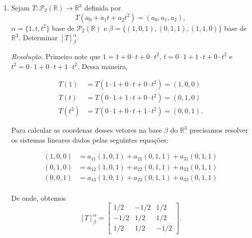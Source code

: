 \begin{enumerate}
\item Sejam $T: \mathcal{P}_2(\mathbb{R}) \rightarrow \mathbb{R}^{3}$  definida por $$T(a_0+a_1t+a_2t^2)=(a_0,a_1,a_2),$$ $\alpha = \{ 1, t, t^2\}$ base de  $\mathcal{P}_2(\mathbb{R})$ e $\beta =\{ (1,0,1), (0,1,1), (1,1,0)\}$   base de $\mathbb{R}^{3}$. Determinar $[T]_{\beta}^{\alpha}$.


\noindent\textit{Resolução.} Primeiro note que $1= 1+0\cdot t+0\cdot t^2$, $t=0\cdot 1+1\cdot t+0 \cdot t^2$ e $t^2=0\cdot 1+0\cdot t+1\cdot t^2$. Dessa maneira,

\begin{align*}
T(1)&=T(1 \cdot 1+0\cdot t+0\cdot t^2)=(1,0,0)\\
T(t)&=T(0\cdot 1+1\cdot t+0 \cdot t^2)=(0,1,0)\\
 T(t^2)&=T(0\cdot 1+0\cdot t+1\cdot t^2)=(0,0,1).
\end{align*}

Para calcular as coordenas desses vetores na base $\beta$ do $\mathbb{R}^{3}$ precisamos resolver os  sistemas lineares  dados pelas seguintes equações:

\begin{align*}
(1,0,0)&=a_{11}(1,0,1) + a_{21} (0,1,1)+a_{31}(0,1,1) \\
(0,1,0)&=a_{12}(1,0,1) + a_{22} (0,1,1)+a_{32}(0,1,1) \\
(0,0,1)&=a_{13}(1,0,1) + a_{23} (0,1,1)+a_{33}(0,1,1) \\
\end{align*}

 De onde, obtemos
$$[T]_{\beta}^{\alpha}=\left[ \begin{array}{ccc}1/2 &-1/2&1/2 \\ -1/2 &1/2&1/2  \\  1/2&1/2&-1/2 \end{array} \right].$$


\end{enumerate}

